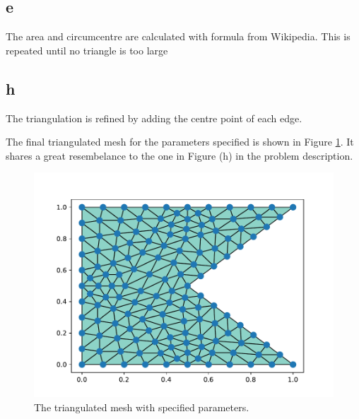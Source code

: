 \documentclass[aps, 12pt]{revtex4}
\begin{document}
\subsection*{e}
The area and circumcentre are calculated with formula from Wikipedia. This is repeated until no triangle is too large

\subsection*{h}
The triangulation is refined by adding the centre point of each edge.


The final triangulated mesh for the parameters specified is shown in Figure \ref{fig:triang}. It shares a great resembelance to the one in Figure (h) in the problem description.

\begin{figure}
    \includegraphics[width=0.8\linewidth]{triangulated.pdf}
    \caption{The triangulated mesh with specified parameters.}
    \label{fig:triang}
\end{figure}



\begin{thebibliography}{99}
\end{thebibliography}
\end{document}
